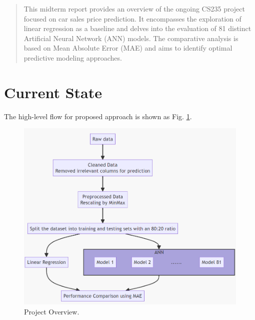 \documentclass[manuscript,screen,review,nonacm]{acmart}
\begin{document}
\begin{abstract}
  This midterm report provides an overview of the ongoing CS235 project focused on car sales price prediction. It encompasses the exploration of linear regression as a baseline and delves into the evaluation of 81 distinct Artificial Neural Network (ANN) models. The comparative analysis is based on Mean Absolute Error (MAE) and aims to identify optimal predictive modeling approaches.
\end{abstract}



\maketitle

\section{Current State}

The high-level flow for proposed approach is shown as Fig. \ref{fig:flowchart}.   

\begin{figure}
  \centering
  \includegraphics[width=0.8\linewidth]{flowchart.png}
  \caption{Project Overview.}
  \label{fig:flowchart}
\end{figure}
\end{document}
